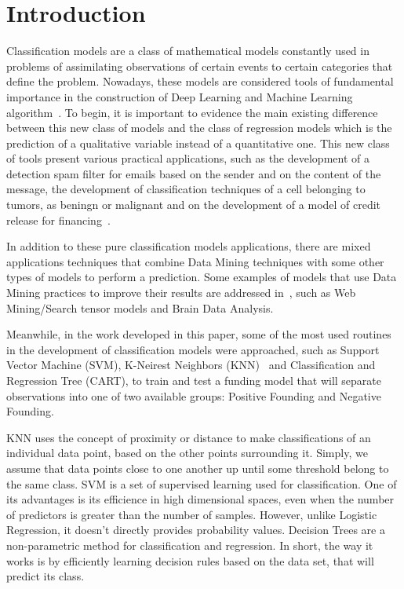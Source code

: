 \section{Introduction}
Classification models are a class of mathematical models constantly used in problems of
assimilating observations of certain events to certain categories that define the problem.
Nowadays, these models are considered tools of fundamental importance in the construction 
of Deep Learning and Machine Learning algorithm~\cite{Kuhn2013, Hastie2009}. To begin, it is important to evidence 
the main existing difference between this new class of models and the class of 
regression models which is the prediction of a qualitative variable instead of a quantitative
one. This new class of tools present various practical applications, such as the 
development of a detection spam filter for emails based on the sender and on the content
of the message, the development of classification techniques of a cell belonging to tumors, 
as beningn or malignant and on the development of a model of credit release for financing~\cite{James2013}.

In addition to these pure classification models applications, there are mixed applications 
techniques that combine Data Mining techniques with some other types of models to perform
a prediction. Some examples of models that use Data Mining practices to improve their 
results are addressed in~\cite{Sidiropoulos2016}, such as Web Mining/Search 
tensor models and Brain Data Analysis. 

Meanwhile, in the work developed in this paper, some of the most used routines in the
development of classification models were approached, such as Support Vector Machine (SVM),
K-Neirest Neighbors (KNN)~\cite{Muniz2010} and Classification and Regression Tree (CART), to train and 
test a funding model that will separate observations into one of two available groups:
Positive Founding and Negative Founding.

KNN uses the concept of proximity or distance to make classifications of an individual 
data point, based on the other points surrounding it. Simply, we assume that data 
points close to one another up until some threshold belong to the same class.
SVM is a set of supervised learning used for classification. One of its
advantages is its efficience in high dimensional spaces, even when the number of 
predictors is greater than the number of samples. However, unlike Logistic Regression,
it doesn't directly provides probability values. Decision Trees are a non-parametric
method for classification and regression. In short, the way it works is by efficiently
learning decision rules based on the data set, that will predict its class.

